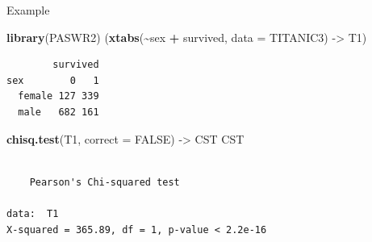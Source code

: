 \documentclass[
  ignorenonframetext,
]{beamer}
\newenvironment{Shaded}{\begin{snugshade}}{\end{snugshade}}
\newcommand{\AttributeTok}[1]{\textcolor[rgb]{0.13,0.29,0.53}{#1}}
\newcommand{\ConstantTok}[1]{\textcolor[rgb]{0.56,0.35,0.01}{#1}}
\newcommand{\FunctionTok}[1]{\textcolor[rgb]{0.13,0.29,0.53}{\textbf{#1}}}
\newcommand{\NormalTok}[1]{#1}
\newcommand{\OtherTok}[1]{\textcolor[rgb]{0.56,0.35,0.01}{#1}}
\newcommand{\SpecialCharTok}[1]{\textcolor[rgb]{0.81,0.36,0.00}{\textbf{#1}}}
\begin{document}
\begin{frame}[fragile]{Example}
\protect\hypertarget{example}{}
\begin{Shaded}
\begin{Highlighting}[]
\FunctionTok{library}\NormalTok{(PASWR2)}
\NormalTok{(}\FunctionTok{xtabs}\NormalTok{(}\SpecialCharTok{\textasciitilde{}}\NormalTok{sex }\SpecialCharTok{+}\NormalTok{ survived, }\AttributeTok{data =}\NormalTok{ TITANIC3) }\OtherTok{{-}\textgreater{}}\NormalTok{ T1)}
\end{Highlighting}
\end{Shaded}

\begin{verbatim}
        survived
sex        0   1
  female 127 339
  male   682 161
\end{verbatim}

\begin{Shaded}
\begin{Highlighting}[]
\FunctionTok{chisq.test}\NormalTok{(T1, }\AttributeTok{correct =} \ConstantTok{FALSE}\NormalTok{) }\OtherTok{{-}\textgreater{}}\NormalTok{ CST}
\NormalTok{CST}
\end{Highlighting}
\end{Shaded}

\begin{verbatim}

    Pearson's Chi-squared test

data:  T1
X-squared = 365.89, df = 1, p-value < 2.2e-16
\end{verbatim}
\end{frame}
\end{document}
